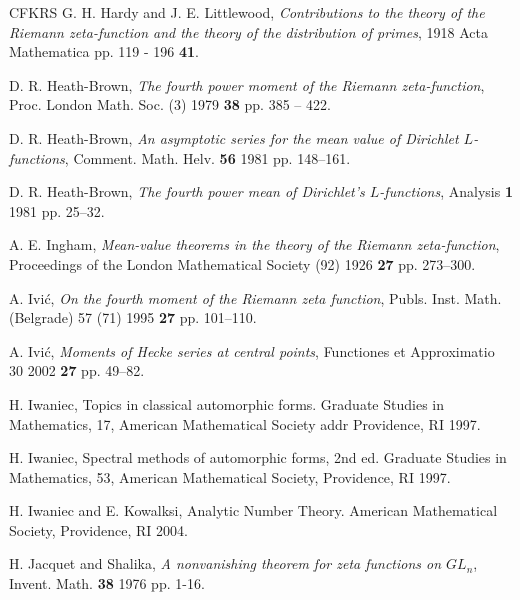 \documentclass[12pt,letterpaper]{amsart}
\theoremstyle{plain}
\theoremstyle{definition}
\theoremstyle{remark}
\numberwithin{equation}{subsection}
\numberwithin{theorem}{subsection}
\numberwithin{table}{subsection}
\begin{document}
\begin{thebibliography}{CFKRS}
\newblock
 G. H. Hardy and J. E. Littlewood,  {\it Contributions to the theory of the Riemann zeta-function and the theory of the distribution of primes},   1918
  Acta Mathematica
 pp. 119 - 196
 {\bf 41}.





\newblock
 D. R. Heath-Brown,  {\it The fourth power moment of the Riemann zeta-function},   Proc. London Math. Soc. (3)
  1979
 {\bf 38}  pp. 385 -- 422.




\newblock
 D. R. Heath-Brown,  {\it An asymptotic series for the mean value of Dirichlet $L$-functions},   Comment. Math. Helv.
 {\bf  56}   1981
 pp.  148--161.




\newblock
 D. R. Heath-Brown,  {\it The fourth power mean of Dirichlet's $L$-functions},   Analysis
 {\bf 1}   1981
 pp. 25--32.




\newblock
 A. E. Ingham,  {\it Mean-value theorems in the theory of the Riemann zeta-function},   Proceedings of the London Mathematical Society  (92)
  1926
 {\bf 27}  pp. 273--300.

\newblock
 A. Ivi\'c,  {\it On the fourth moment of the Riemann zeta function}, 
  Publs. Inst. Math. (Belgrade) 57 (71) 
  1995
 {\bf 27}  pp. 101--110.

\newblock
 A. Ivi\'c,  {\it Moments of Hecke series at central points},
  Functiones et Approximatio 30
  2002
 {\bf 27}  pp. 49--82.


\newblock
 H. Iwaniec,  Topics in classical automorphic forms. Graduate Studies in Mathematics, 17,   American Mathematical Society
 addr  Providence, RI
  1997.




\newblock   H. Iwaniec,  Spectral
methods of automorphic forms, 2nd ed. Graduate Studies in Mathematics, 53,   American Mathematical Society,  Providence, RI   1997.

\newblock
 H. Iwaniec and E. Kowalksi,  Analytic Number Theory.
  American Mathematical Society,  Providence, RI
  2004.


\newblock
 H. Jacquet and Shalika,  {\it A nonvanishing theorem for zeta functions on $GL_n$},   Invent. Math.
 {\bf 38}   1976
 pp. 1-16.



\end{thebibliography}
\end{document}

